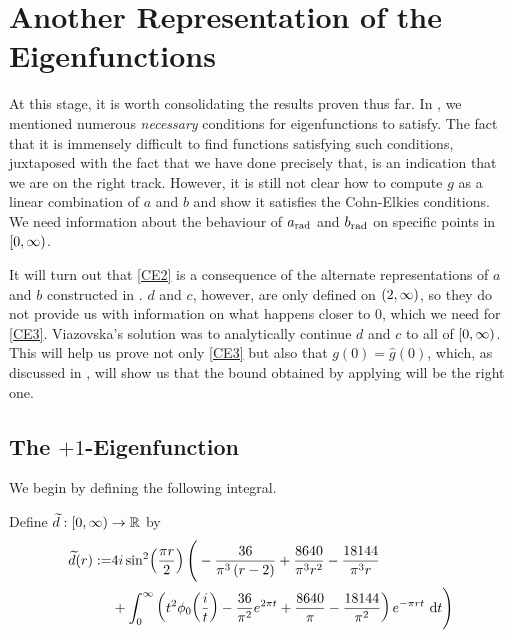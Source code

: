 \section{Another Representation of the Eigenfunctions}
\label{Ch4:Sec:Analytic_Cont}

At this stage, it is worth consolidating the results proven thus far. In , we mentioned numerous \textit{necessary} conditions for eigenfunctions to satisfy. The fact that it is immensely difficult to find functions satisfying such conditions, juxtaposed with the fact that we have done precisely that, is an indication that we are on the right track. However, it is still not clear how to compute $g$ as a linear combination of $a$ and $b$ and show it satisfies the Cohn-Elkies conditions. We need information about the behaviour of $a_{\operatorname{rad}}$ and $b_{\operatorname{rad}}$ on specific points in $\left[0, \infty\right)$.

It will turn out that \ref{CE2} is a consequence of the alternate representations of $a$ and $b$ constructed in . $d$ and $c$, however, are only defined on $\left( 2, \infty \right)$, so they do not provide us with information on what happens closer to $0$, which we need for \ref{CE3}. Viazovska's solution was to analytically continue $d$ and $c$ to all of $\left[0, \infty\right)$. This will help us prove not only \ref{CE3} but also that $g(0) = \hat{g}(0)$, which, as discussed in , will show us that the bound obtained by applying  will be the right one.

\subsection{The $+1$-Eigenfunction}

We begin by defining the following integral.

\begin{boxdefinition}
    Define $\widetilde{d} : \left[0, \infty\right) \to \mathbb{R}$ by
    \begin{align*}
        \widetilde{d}(r) :=&
        4i \sin^2\!\left( \frac{\pi r}{2} \right) \Bigg(
        -\frac{36}{\pi^3\left( r - 2 \right)} + \frac{8640}{\pi^3 r^2} - \frac{18144}{\pi^3 r} \\
        &+\int_{0}^{\infty} \left( t^2 \phi_0\!\left( \frac{i}{t} \right) - \frac{36}{\pi^2}e^{2\pi t} + \frac{8640}{\pi} - \frac{18144}{\pi^2} \right) e^{-\pi r t} \, \operatorname{d}\!{t}\Bigg)
    \end{align*}
\end{boxdefinition}

